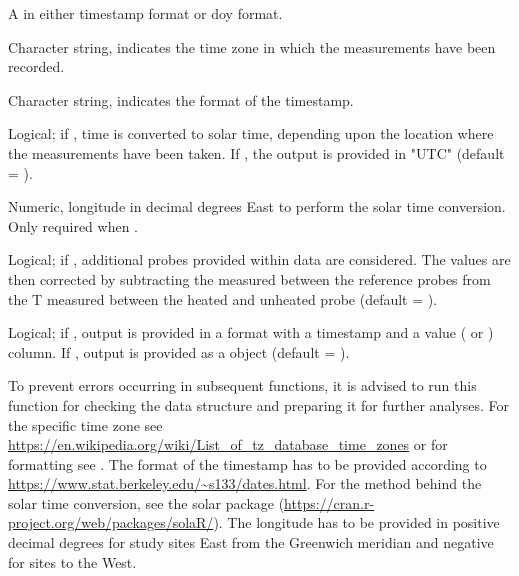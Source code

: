 \documentclass[a4paper]{book}
\begin{document}
\begin{Arguments}
\begin{ldescription}
\item[\code{data}] A  in either timestamp format or doy format.

\item[\code{tz}] Character string, indicates the time zone in which the measurements have been recorded.

\item[\code{time.format}] Character string, indicates the format of the timestamp.

\item[\code{solar.time}] Logical; if , time is converted to solar time,
depending upon the location where the measurements have been taken.
If , the output is provided in "UTC" (default = ).

\item[\code{long.deg}] Numeric, longitude in decimal degrees East to perform the solar time
conversion. Only required when .

\item[\code{ref.add}] Logical; if , additional probes provided within data
are considered. The  values are then corrected by subtracting
the  measured between the reference probes from the \eqn{\Delta}{}
T measured between the heated and unheated probe (default = ).

\item[\code{df}] Logical; if , output is provided in a  format with
a timestamp and a value ( or ) column.
If , output is provided as a  object (default = ).
\end{ldescription}
\end{Arguments}
%
\begin{Details}\relax
To prevent errors occurring in subsequent  functions, it is advised to run this function
for checking the data structure and preparing it for further analyses. For the specific time zone see
\url{https://en.wikipedia.org/wiki/List_of_tz_database_time_zones} or for formatting see .
The format of the timestamp has to be provided according to \url{https://www.stat.berkeley.edu/~s133/dates.html}.
For the method behind the solar time conversion, see the solar package (\url{https://cran.r-project.org/web/packages/solaR/}).
The longitude has to be provided in positive decimal degrees for study sites East from the Greenwich meridian and negative for sites to the West.
\end{Details}
\end{document}
